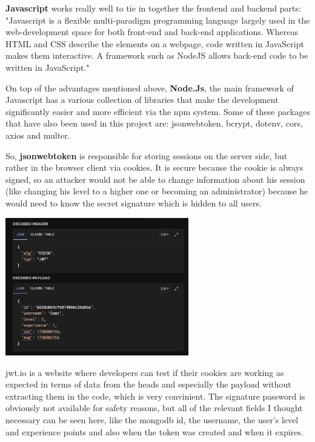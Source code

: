 \documentclass[12pt,a4paper]{report}
\begin{document}
\textbf{Javascript} works really well to tie in together the frontend and backend parts: "Javascript is a flexible multi-paradigm programming language largely used in the web-development space for both front-end and back-end applications. Whereas HTML and CSS describe the elements on a webpage, code written in JavaScript makes them interactive. A framework such as NodeJS allows back-end code to be written in JavaScript."~\cite{JavaScript}

On top of the advantages mentioned above, \textbf{Node.Js}, the main framework of Javascript has a various collection of libraries that make the development significantly easier and more efficient via the npm system. Some of these packages that have also been used in this project are: jsonwebtoken, bcrypt, dotenv, cors, axios and multer.

So, \textbf{jsonwebtoken} is responsible for storing sessions on the server side, but rather in the browser client via cookies. It is secure because the cookie is always signed, so an attacker would not be able to change information about his session (like changing his level to a higher one or becoming an administrator) because he would need to know the secret signature which is hidden to all users.

\begin{center}
\includegraphics[width=0.6\textwidth]{images/token.png}
\end{center}

jwt.io is a website where developers can test if their cookies are working as expected in terms of data from the heads and especially the payload without extracting them in the code, which is very convinient. The signature password is obviously not available for safety reasons, but all of the relevant fields I thought necessary can be seen here, like the mongodb id, the username, the user's level and experience points and also when the token was created and when it expires.
\end{document}
